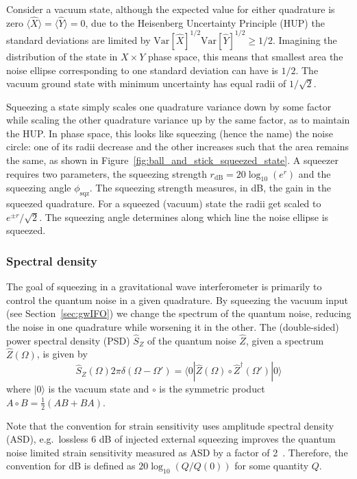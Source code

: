 \documentclass[aps,pra,superscriptaddress,reprint,nofootinbib]{revtex4-1}
\begin{document}
Consider a vacuum state, although the expected value for either quadrature is zero $\langle \hat{X} \rangle = \langle \hat{Y} \rangle = 0$, due to the Heisenberg Uncertainty Principle (HUP) the standard deviations are limited by $\mathrm{Var}[\hat{X}]^{1/2} \mathrm{Var}[\hat{Y}]^{1/2} \geq 1/2$. Imagining the distribution of the state in $X \times Y$ phase space, this means that smallest area the noise ellipse corresponding to one standard deviation can have is $1/2$. The vacuum ground state with minimum uncertainty has equal radii of $1/\sqrt{2}$.


Squeezing a state simply scales one quadrature variance down by some factor while scaling the other quadrature variance up by the same factor, as to maintain the HUP. In phase space, this looks like squeezing (hence the name) the noise circle: one of its radii decrease and the other increases such that the area remains the same, as shown in Figure~\ref{fig:ball_and_stick_squeezed_state}. A squeezer requires two parameters, the squeezing strength $r_{\mathrm{dB}} = 20 \log_{10}(e^r)$ and the squeezing angle $\phi_{\mathrm{sqz}}$. The squeezing strength measures, in dB, the gain in the squeezed quadrature. For a squeezed (vacuum) state the radii get scaled to $e^{\pm r}/\sqrt{2}$. The squeezing angle determines along which line the noise ellipse is squeezed.

\subsubsection{Spectral density}

The goal of squeezing in a gravitational wave interferometer is primarily to control the quantum noise in a given quadrature. By squeezing the vacuum input (see Section~\ref{sec:gwIFO}) we change the spectrum of the quantum noise, reducing the noise in one quadrature while worsening it in the other. The (double-sided) power spectral density (PSD) $\hat{S}_Z$ of the quantum noise $\hat{Z}$, given a spectrum $\hat{Z}(\Omega)$, is given by $$\hat{S}_Z(\Omega) 2 \pi \delta(\Omega - \Omega') = \langle0| \hat{Z}(\Omega) \circ \hat{Z}^\dagger(\Omega') |0\rangle$$ where $|0\rangle$ is the vacuum state and $\circ$ is the symmetric product $A \circ B = \frac{1}{2}(A B + B A)$.

Note that the convention for strain sensitivity uses amplitude spectral density (ASD), e.g.\ lossless 6 dB of injected external squeezing improves the quantum noise limited strain sensitivity measured as ASD by a factor of 2~\cite{Aasi_2013}.
Therefore, the convention for dB is defined as $20 \log_{10}(Q/{Q(0)})$ for some quantity $Q$.
\end{document}
